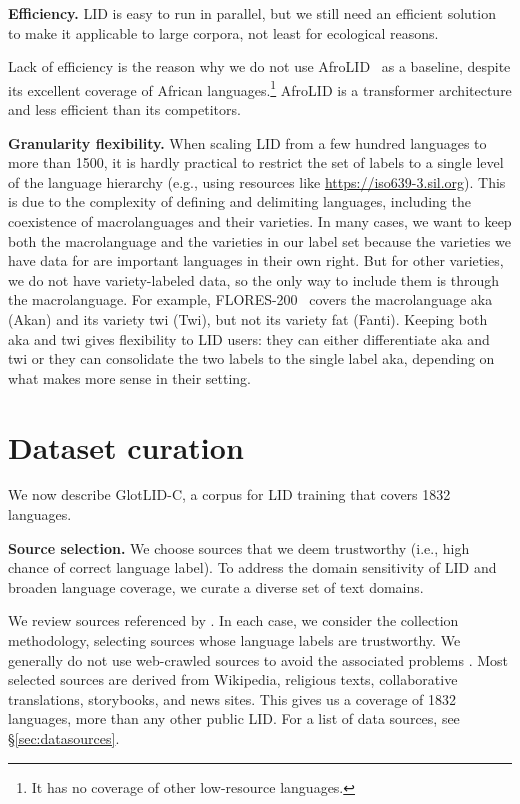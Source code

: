 \documentclass[11pt]{article}
\def\numberlanguagestotal{1832\xspace}
\def\corpusname{\mbox{GlotLID-C}\xspace}
\def\macrolanguage{macrolanguage\xspace}
\def\macrolanguages{macrolanguages\xspace}
\def\flores{FLORES\xspace}
\def\seclabel#1{\label{sec:#1}\label{p:#1}}
\def\secref#1{\S\ref{sec:#1}}
\begin{document}
\textbf{Efficiency.} LID is easy to run in parallel, but we
still need an efficient solution to make it applicable
to large corpora, not least for ecological reasons. 

Lack of efficiency is the reason why we do not use
AfroLID~\citep{adebara-etal-2022-afrolid} as a baseline,
despite its excellent coverage of
African languages.\footnote{It has no coverage of other low-resource languages.} 
AfroLID
is a transformer
architecture and
less efficient than its competitors.


\textbf{Granularity flexibility.} When scaling LID from a
few hundred languages to more than 1500, it is hardly practical
to restrict the set of labels to a single
level of the language hierarchy (e.g., using resources like
\url{https://iso639-3.sil.org}). This is  due to the complexity of defining
and delimiting languages, including the
coexistence of \macrolanguages and their varieties. In many
cases, we  want to keep both the \macrolanguage and the
varieties in our label set because the varieties we have data
for are
important languages in their own right. But for other
varieties, we do not have variety-labeled data, so the only
way to include them is through
the \macrolanguage. For example, \flores-200~\citep{nllbteam2022language} covers the \macrolanguage
aka (Akan) and its variety twi (Twi), but not its variety
fat (Fanti).
Keeping both aka and twi gives flexibility to 
LID users: they can either differentiate aka and twi
or they can
consolidate the two labels to the single label aka,
depending on what makes more sense in their setting. 



\section{Dataset curation}
\seclabel{glotliddataset}
We now describe \corpusname, a corpus for  LID training that covers 
\numberlanguagestotal languages.

\textbf{Source selection.}
We choose sources that we deem trustworthy (i.e., high
chance of correct language label).
To address the domain sensitivity of
LID  and broaden language coverage, we curate
a diverse set of text domains.

We review sources referenced
by \citet{imanigooghari-etal-2023-glot500, burchell-etal-2023-open, blaschke-etal-2023-survey, adebara-etal-2022-afrolid, adebara-abdul-mageed-2022-towards}.
In each case, we consider the collection methodology,
selecting sources whose language labels are trustworthy.
We generally do not use web-crawled sources
to avoid the associated problems
\cite{kreutzer-etal-2022-quality}. 
Most selected sources are derived from Wikipedia, religious
texts, collaborative translations, storybooks, and news
sites. This gives us a coverage
of \numberlanguagestotal languages, more than any other
public LID. For a list of data sources, see \secref{datasources}.
\end{document}
